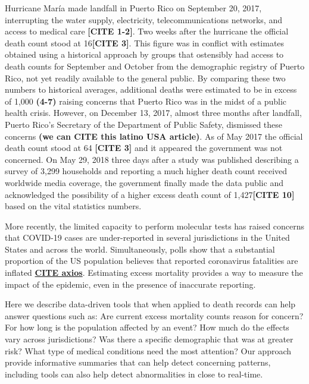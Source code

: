 \documentclass[11pt]{article}
\begin{document}
Hurricane Mar\'ia made landfall in Puerto Rico on September 20, 2017, interrupting the water supply, electricity, telecommunications networks, and access to medical care \textbf{[CITE 1-2]}. Two weeks after the hurricane the official death count stood at 16\textbf{[CITE 3]}. This figure was in conflict with estimates obtained using a historical approach by groups that ostensibly had access to death counts for September and October from the demographic registry of Puerto Rico, not yet readily available to the general public. By comparing these two numbers to historical averages, additional deaths were estimated to be in excess of 1,000 \textbf{(4-7)} raising concerns that Puerto Rico was in the midst of a public health crisis. However, on December 13, 2017, almost three months after landfall, Puerto Rico’s Secretary of the Department of Public Safety, dismissed these concerns \textbf{(we can CITE this latino USA article)}. As of May 2017 the official death count stood at 64 \textbf{[CITE 3]} and it appeared the government was not concerned. On May 29, 2018 three days after a study was published describing a survey of 3,299 households and reporting a much higher death count received worldwide media coverage, the government finally made the data public and acknowledged the possibility of a higher excess death count of 1,427\textbf{[CITE 10]} based on the vital statistics numbers. 

More recently, the limited capacity to perform molecular tests has raised concerns that COVID-19 cases are under-reported in several jurisdictions in the United States and across the world. Simultaneously, polls show that a substantial proportion of the US population believes that reported coronavirus fatalities are inflated \href{https://www.axios.com/axios-ipsos-coronavirus-week-8-5a1947d5-9850-4e58-9583-9b617e6fdc1b.html}{\textbf{CITE axios}}. Estimating excess mortality provides a way to measure the impact of the epidemic, even in the presence of inaccurate reporting.

Here we describe data-driven tools that when applied to death records can help answer questions such as: Are current excess mortality counts reason for concern? For how long is the population affected by an event?  How much do the effects vary across jurisdictions?  Was there a specific demographic that was at greater risk? What type of medical conditions need the most attention? Our approach provide informative summaries that can help detect concerning patterns, including tools can also help detect abnormalities in close to real-time. 
\end{document}
